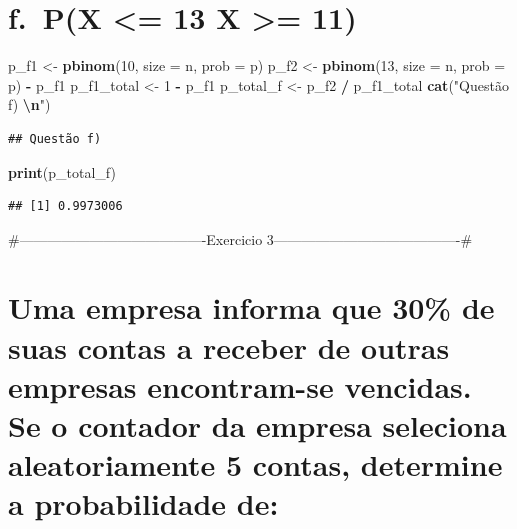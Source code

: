 \documentclass[
]{article}
\newenvironment{Shaded}{\begin{snugshade}}{\end{snugshade}}
\newcommand{\AttributeTok}[1]{\textcolor[rgb]{0.13,0.29,0.53}{#1}}
\newcommand{\DecValTok}[1]{\textcolor[rgb]{0.00,0.00,0.81}{#1}}
\newcommand{\FunctionTok}[1]{\textcolor[rgb]{0.13,0.29,0.53}{\textbf{#1}}}
\newcommand{\NormalTok}[1]{#1}
\newcommand{\OtherTok}[1]{\textcolor[rgb]{0.56,0.35,0.01}{#1}}
\newcommand{\SpecialCharTok}[1]{\textcolor[rgb]{0.81,0.36,0.00}{\textbf{#1}}}
\newcommand{\StringTok}[1]{\textcolor[rgb]{0.31,0.60,0.02}{#1}}
\begin{document}
\section{f.~P(X \textless= 13 \textbar{} X \textgreater=
11)}\label{f.-px-13-x-11}

\begin{Shaded}
\begin{Highlighting}[]
\NormalTok{p\_f1 }\OtherTok{\textless{}{-}} \FunctionTok{pbinom}\NormalTok{(}\DecValTok{10}\NormalTok{, }\AttributeTok{size =}\NormalTok{ n, }\AttributeTok{prob =}\NormalTok{ p)}
\NormalTok{p\_f2 }\OtherTok{\textless{}{-}} \FunctionTok{pbinom}\NormalTok{(}\DecValTok{13}\NormalTok{, }\AttributeTok{size =}\NormalTok{ n, }\AttributeTok{prob =}\NormalTok{ p) }\SpecialCharTok{{-}}\NormalTok{ p\_f1}
\NormalTok{p\_f1\_total }\OtherTok{\textless{}{-}} \DecValTok{1} \SpecialCharTok{{-}}\NormalTok{ p\_f1}
\NormalTok{p\_total\_f }\OtherTok{\textless{}{-}}\NormalTok{ p\_f2 }\SpecialCharTok{/}\NormalTok{ p\_f1\_total}
\FunctionTok{cat}\NormalTok{(}\StringTok{"Questão f) }\SpecialCharTok{\textbackslash{}n}\StringTok{"}\NormalTok{)}
\end{Highlighting}
\end{Shaded}

\begin{verbatim}
## Questão f)
\end{verbatim}

\begin{Shaded}
\begin{Highlighting}[]
\FunctionTok{print}\NormalTok{(p\_total\_f)}
\end{Highlighting}
\end{Shaded}

\begin{verbatim}
## [1] 0.9973006
\end{verbatim}

\#----------------------------------------Exercicio
3----------------------------------------\#

\section{Uma empresa informa que 30\% de suas contas a receber de outras
empresas encontram-se vencidas. Se o contador da empresa seleciona
aleatoriamente 5 contas, determine a probabilidade
de:}\label{uma-empresa-informa-que-30-de-suas-contas-a-receber-de-outras-empresas-encontram-se-vencidas.-se-o-contador-da-empresa-seleciona-aleatoriamente-5-contas-determine-a-probabilidade-de}
\end{document}
